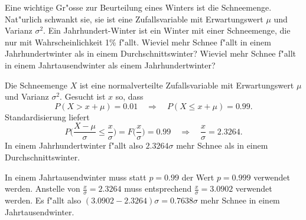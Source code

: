 Eine wichtige Gr"osse zur Beurteilung eines Winters ist die Schneemenge.
Nat"urlich schwankt sie, sie ist eine Zufallsvariable mit
Erwartungswert $\mu$ und Varianz $\sigma^2$.
Ein Jahrhundert-Winter ist ein Winter mit einer Schneemenge, die nur
mit Wahrscheinlichkeit 1\% f"allt. Wieviel mehr Schnee f"allt in einem
Jahrhundertwinter als in einem Durchschnittswinter? Wieviel mehr
Schnee f"allt in einem Jahrtausendwinter als einem Jahrhundertwinter?

\begin{loesung}
Die Schneemenge $X$ ist eine normalverteilte Zufallsvariable mit
Erwartungswert $\mu$ und Varianz $\sigma^2$. Gesucht ist $x$ so,
dass
\[ 
P(X > x+\mu) = 0.01\quad\Rightarrow\quad
P(X\le x+\mu) =0.99.
\]
Standardisierung liefert
\[
P\biggl(\frac{X-\mu}{\sigma}\le \frac{x}{\sigma}\biggr)=F\biggl(\frac{x}{\sigma}\biggr)=0.99
\quad\Rightarrow\quad \frac{x}{\sigma}=2.3264.
\]
In einem Jahrhundertwinter f"allt also $2.3264\sigma$ mehr Schnee als
in einem Durchschnittswinter.

In einem Jahrtausendwinter muss statt $p=0.99$ der Wert $p=0.999$
verwendet werden. Anstelle von $\frac{x}{\sigma}=2.3264$ muss entsprechend
$\frac{x}{\sigma}=3.0902$ verwendet
werden. Es f"allt also $(3.0902-2.3264)\sigma = 0.7638\sigma$
mehr Schnee in einem Jahrtausendwinter.
\end{loesung}

